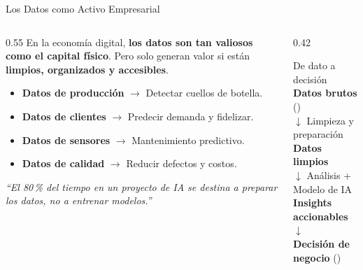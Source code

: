 \documentclass[aspectratio=169]{beamer}
\begin{document}
\begin{frame}{Los Datos como Activo Empresarial}
  \begin{columns}[T]
    \begin{column}{0.55\textwidth}
      \small
      En la economía digital, \textbf{los datos son tan valiosos como el capital físico}.
      Pero solo generan valor si están \textbf{limpios, organizados y accesibles}.

      \vspace{0.15cm}
      \begin{itemize}\setlength\itemsep{3pt}
        \item \textbf{Datos de producción} $\rightarrow$ Detectar cuellos de botella.
        \item \textbf{Datos de clientes} $\rightarrow$ Predecir demanda y fidelizar.
        \item \textbf{Datos de sensores} $\rightarrow$ Mantenimiento predictivo.
        \item \textbf{Datos de calidad} $\rightarrow$ Reducir defectos y costos.
      \end{itemize}

      \vspace{0.15cm}
      \textit{``El 80\,\% del tiempo en un proyecto de IA se destina a preparar los datos, no a entrenar modelos.''}
    \end{column}
    \begin{column}{0.42\textwidth}
      \begin{conceptbox}{\faChartLine\enspace De dato a decisión}
        \small
        \textbf{Datos brutos} (\faDatabase)\\[2pt]
        $\downarrow$ Limpieza y preparación\\[2pt]
        \textbf{Datos limpios}\\[2pt]
        $\downarrow$ Análisis + Modelo de IA\\[2pt]
        \textbf{Insights accionables}\\[2pt]
        $\downarrow$\\[2pt]
        \textbf{Decisión de negocio} (\faChartBar)
      \end{conceptbox}
    \end{column}
  \end{columns}
\end{frame}
\end{document}
